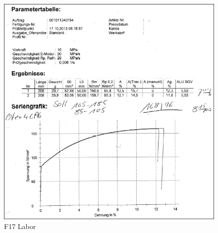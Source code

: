 \documentclass[12pt,a4paper,parskip]{scrartcl}
\begin{document}
\begin{figure}[hbtp]
\centering
\includegraphics[width=1\textwidth]{F17Labor.jpg}
\caption{F17 Labor}
\end{figure}
\end{document}
